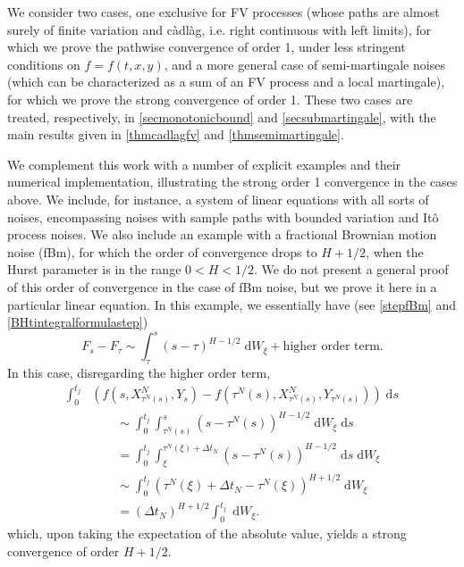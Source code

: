 \documentclass[reqno,12pt]{amsart}
\theoremstyle{plain} %
\theoremstyle{definition} %
\begin{document}
We consider two cases, one exclusive for FV processes (whose paths are almost surely of finite variation and c\`adl\`ag, i.e. right continuous with left limits), for which we prove the pathwise convergence of order 1, under less stringent conditions on $f=f(t, x, y)$, and a more general case of semi-martingale noises (which can be characterized as a sum of an FV process and a local martingale), for which we prove the strong convergence of order 1. These two cases are treated, respectively, in \cref{secmonotonicbound} and \cref{secsubmartingale}, with the main results given in \cref{thmcadlagfv} and \cref{thmsemimartingale}.

We complement this work with a number of explicit examples and their numerical implementation, illustrating the strong order 1 convergence in the cases above. We include, for instance, a system of linear equations with all sorts of noises, encompassing noises with sample paths with bounded variation and It\^o process noises. We also include an example with a fractional Brownian motion noise (fBm), for which the order of convergence drops to $H + 1/2$, when the Hurst parameter is in the range $0 < H < 1/2$. We do not present a general proof of this order of convergence in the case of fBm noise, but we prove it here in a particular linear equation. In this example, we essentially have (see \eqref{stepfBm} and \eqref{BHtintegralformulastep})
\[
    F_s - F_\tau \sim \int_\tau^s (s-\tau)^{H-1/2}\;\mathrm{d}W_\xi + \text{higher order term}.
\]
In this case, disregarding the higher order term,
\begin{align*}
    \int_0^{t_j} & \left( f(s, X_{\tau^N(s)}^N, Y_s) - f(\tau^N(s), X_{\tau^N(s)}^N, Y_{\tau^N(s)}) \right)\;\mathrm{d}s \\ 
    & \qquad \sim \int_0^{t_j} \int_{\tau^N(s)}^s (s-\tau^N(s))^{H-1/2} \;\mathrm{d} W_\xi\;\mathrm{d}s \\
    & \qquad = \int_0^{t_j} \int_{\xi}^{\tau^N(\xi) + \Delta t_N} (s-\tau^N(s))^{H-1/2} \;\mathrm{d}s \;\mathrm{d} W_\xi \\
    & \qquad \sim \int_0^{t_j} (\tau^N(\xi) + \Delta t_N - \tau^N(\xi))^{H+1/2} \;\mathrm{d} W_\xi \\
    & \qquad = (\Delta t_N)^{H+1/2} \int_0^{t_j} \;\mathrm{d} W_\xi.
\end{align*}
which, upon taking the expectation of the absolute value, yields a strong convergence of order $H + 1/2$.
\end{document}

